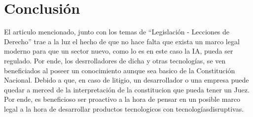 \documentclass[10pt, a4paper]{article}
\begin{document}
\section{Conclusión}
\label{sec:conslusion}

El articulo mencionado, junto con los temas de \enquote{Legislación - Lecciones de Derecho} trae a la luz el hecho de que no hace falta que exista un marco legal moderno para que un sector nuevo, como lo es en este caso la IA, pueda ser regulado. Por ende, los desrrolladores de dicha y otras tecnologías, se ven beneficiados al poseer un conocimiento aunque sea basico de la Constitución Nacional. Debido a que, en caso de litigio, un desarrollador o una empresa puede quedar a merced de la interpretación de la constitucion que pueda tener un Juez. 
 Por ende, es beneficioso ser proactivo a la hora de pensar en un posible marco legal a la hora de desarrollar productos tecnologicos con tecnologíasdisruptivas.


\printbibliography

\end{document}
